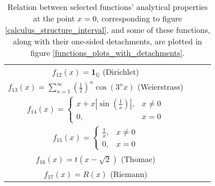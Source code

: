\documentclass[11pt]{book}
\begin{document}
\begin{table}[h!]
\begin{tabular}{cccc}
        $f_{12}\left(x\right)=\boldsymbol{1}_{\mathbb{Q}}$ (Dirichlet) & & & \\
        $f_{13}\left(x\right)=\sum_{n=1}^{\infty}\left(\frac{1}{2}\right)^{n}\cos\left(3^{n}x\right)$ (Weierstrass) & \color[HTML]{FFD400}{V} & & \color[HTML]{0039BD}{V} \\
        $f_{14}\left(x\right)=\begin{cases}
x+x\left|\sin\left(\frac{1}{x}\right)\right|, & x\neq0\\
0, & x=0
\end{cases}$ & \color[HTML]{FFD400}{V} & & \color[HTML]{0039BD}{V} \\
        $f_{15}\left(x\right)=\begin{cases}
\frac{1}{x}, & x\neq0\\
0, & x=0
\end{cases}$ & & & \color[HTML]{0039BD}{V} \\
        $f_{16}\left(x\right)=t\left(x-\sqrt{2}\right)$ (Thomae) & \color[HTML]{FFD400}{V} & & \\
        $f_{17}\left(x\right)=R\left(x\right)$ (Riemann) & \color[HTML]{FFD400}{V} & & \color[HTML]{0039BD}{V} \\
        \bottomrule
        \end{tabular}
\caption{Relation between selected functions' analytical properties at the point $x=0$, corresponding to figure \ref{calculus_structure_interval}, and some of these functions, along with their one-sided detachments, are plotted in figure \ref{functions_plots_with_detachments}.}
\label{pointwise_properties_examples}
\end{table}
\end{document}

